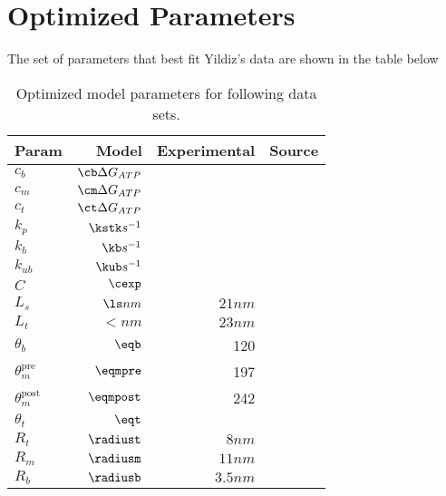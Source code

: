 \section{Optimized Parameters}
The set of parameters that best fit Yildiz's data are shown in the table below


\begin{table}[H]
  \centering
  \begin{tabular}{|l | r | r | r|}
  	\hline
    Param & Model & Experimental & Source \\
    \hline
    $c_b$ & $\cb \Delta G_{ATP}$ &  & \\
    $c_m$ & $\cm \Delta G_{ATP}$ &  & \\
    $c_t$ & $\ct \Delta G_{ATP}$ &  & \\
    $k_p$ & $\kstk s^{-1}$&  & \\
    $k_b$ & $\kb s^{-1}$&  & \\
    $k_{ub}$ & $\kub s^{-1}$ & & \\
    $C$ & $\cexp$ & & \\
    $L_s$ & $\ls nm$ & $21nm$ & \cite{Burgess2003, 3vkh-cite, carter-paper}\\
    $L_t$ & $\lt nm$ & $23nm$ & \cite{Burgess2003, 3vkh-cite, carter-paper}\\
    $\theta_b$ & $\eqb$ &  120 & \cite{leschziner} \\
    $\theta_m^{\mbox{pre}}$ & $\eqmpre$ &  197 & \cite{Burgess2003}\\
    $\theta_m^{\mbox{post}}$ & $\eqmpost$ & 242 & \cite{Burgess2003}\\
    $\theta_t$ & $\eqt$ &  & \\
    $R_t$ & $\radiust$ & $8nm$ & \cite{Burgess2003}\\
    $R_m$ & $\radiusm$ & $11nm$ & \cite{Burgess2003}\\
    $R_b$ & $\radiusb$ & $3.5nm$ & \cite{Burgess2003}\\
    \hline
  \end{tabular}
  \caption{Optimized model parameters for following data sets. }
  \label{tab:params}
\end{table}

